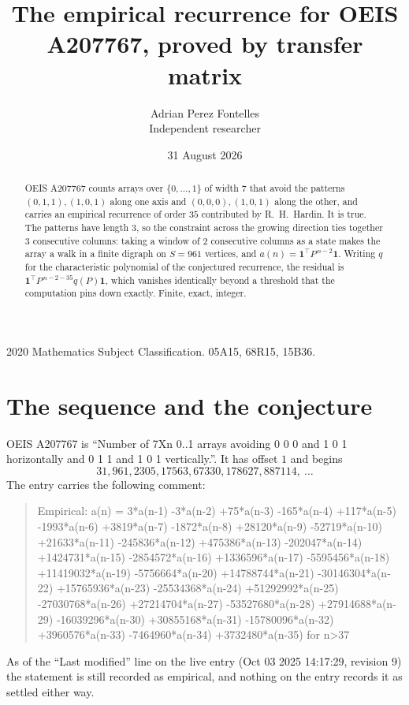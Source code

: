 \documentclass[11pt,a4paper]{article}
\title{The empirical recurrence for OEIS A207767, proved by transfer matrix}
\author{Adrian Perez Fontelles\\ \small Independent researcher}
\date{31 August 2026}
\theoremstyle{plain}
\theoremstyle{definition}
\begin{document}
\maketitle

\begin{abstract}
OEIS A207767 counts arrays over $\{0,\dots,1\}$ of width $7$ that avoid the patterns
$(0,1,1), (1,0,1)$ along one axis and $(0,0,0), (1,0,1)$ along the other, and carries an empirical recurrence of
order $35$ contributed by R.~H.~Hardin. It is true. The patterns have length $3$, so
the constraint across the growing direction ties together $3$ consecutive columns: taking a
window of $2$ consecutive columns as a state makes the array a walk in a finite digraph
on $S=961$ vertices, and $a(n)=\mathbf{1}^{\!\top}P^{\,n-2}\mathbf{1}$. Writing $q$
for the characteristic polynomial of the conjectured recurrence, the residual is
$\mathbf{1}^{\!\top}P^{\,n-2-35}q(P)\mathbf{1}$, which vanishes identically
beyond a threshold that the computation pins down exactly. Finite, exact, integer.
\end{abstract}

\noindent\small 2020 Mathematics Subject Classification. 05A15, 68R15, 15B36.\normalsize

\section{The sequence and the conjecture}

OEIS A207767 is ``Number of 7Xn 0..1 arrays avoiding 0 0 0 and 1 0 1 horizontally and 0 1 1 and 1 0 1 vertically.''. It has offset
$1$ and begins
\[
31, 961, 2305, 17563, 67330, 178627, 887114,\ \dots
\]
The entry carries the following comment:
\begin{quote}\small
Empirical: a(n) = 3*a(n-1) -3*a(n-2) +75*a(n-3) -165*a(n-4) +117*a(n-5) -1993*a(n-6) +3819*a(n-7) -1872*a(n-8) +28120*a(n-9) -52719*a(n-10) +21633*a(n-11) -245836*a(n-12) +475386*a(n-13) -202047*a(n-14) +1424731*a(n-15) -2854572*a(n-16) +1336596*a(n-17) -5595456*a(n-18) +11419032*a(n-19) -5756664*a(n-20) +14788744*a(n-21) -30146304*a(n-22) +15765936*a(n-23) -25534368*a(n-24) +51292992*a(n-25) -27030768*a(n-26) +27214704*a(n-27) -53527680*a(n-28) +27914688*a(n-29) -16039296*a(n-30) +30855168*a(n-31) -15780096*a(n-32) +3960576*a(n-33) -7464960*a(n-34) +3732480*a(n-35) for n>37
\end{quote}
As of the ``Last modified'' line on the live entry (Oct 03 2025 14:17:29, revision
9) the statement is still recorded as empirical, and nothing on the entry
records it as settled either way.
\end{document}
